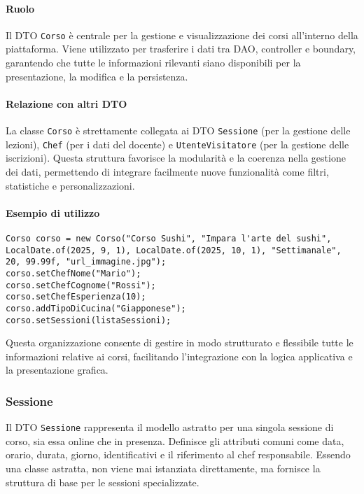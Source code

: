 \paragraph{Ruolo}
Il DTO \texttt{Corso} è centrale per la gestione e visualizzazione dei corsi all'interno della piattaforma. Viene utilizzato per trasferire i dati tra DAO, controller e boundary, garantendo che tutte le informazioni rilevanti siano disponibili per la presentazione, la modifica e la persistenza.

\paragraph{Relazione con altri DTO}
La classe \texttt{Corso} è strettamente collegata ai DTO \texttt{Sessione} (per la gestione delle lezioni), \texttt{Chef} (per i dati del docente) e \texttt{UtenteVisitatore} (per la gestione delle iscrizioni). Questa struttura favorisce la modularità e la coerenza nella gestione dei dati, permettendo di integrare facilmente nuove funzionalità come filtri, statistiche e personalizzazioni.

\paragraph{Esempio di utilizzo}
\begin{verbatim}
Corso corso = new Corso("Corso Sushi", "Impara l'arte del sushi", LocalDate.of(2025, 9, 1), LocalDate.of(2025, 10, 1), "Settimanale", 20, 99.99f, "url_immagine.jpg");
corso.setChefNome("Mario");
corso.setChefCognome("Rossi");
corso.setChefEsperienza(10);
corso.addTipoDiCucina("Giapponese");
corso.setSessioni(listaSessioni);
\end{verbatim}

Questa organizzazione consente di gestire in modo strutturato e flessibile tutte le informazioni relative ai corsi, facilitando l'integrazione con la logica applicativa e la presentazione grafica.

\subsubsection{Sessione}
Il DTO \texttt{Sessione} rappresenta il modello astratto per una singola sessione di corso, sia essa online che in presenza. Definisce gli attributi comuni come data, orario, durata, giorno, identificativi e il riferimento al chef responsabile. Essendo una classe astratta, non viene mai istanziata direttamente, ma fornisce la struttura di base per le sessioni specializzate.

